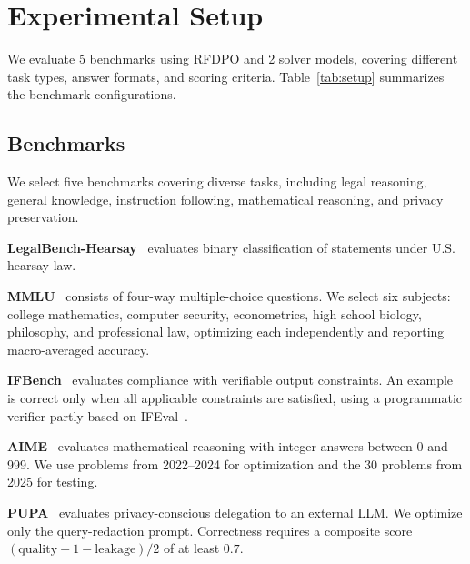 \documentclass[10pt]{article} %
\begin{document}
\section{Experimental Setup}
\label{sec:setup}

We evaluate 5 benchmarks using RFDPO and 2 solver models, covering different task types, answer formats, and scoring criteria. Table~\ref{tab:setup} summarizes the benchmark configurations.

\subsection{Benchmarks}

We select five benchmarks covering diverse tasks, including legal reasoning, general knowledge, instruction following, mathematical reasoning, and privacy preservation.

\textbf{LegalBench-Hearsay}~\citep{guha2023legalbench} evaluates binary classification of statements under U.S. hearsay law.

\textbf{MMLU}~\citep{hendrycks2021mmlu} consists of four-way multiple-choice questions. We select six subjects: college mathematics, computer security, econometrics, high school biology, philosophy, and professional law, optimizing each independently and reporting macro-averaged accuracy.

\textbf{IFBench}~\citep{pyatkin2025ifbench} evaluates compliance with verifiable output constraints. An example is correct only when all applicable constraints are satisfied, using a programmatic verifier partly based on IFEval~\citep{zhou2023ifeval}.

\textbf{AIME}~\citep{maa2025aime} evaluates mathematical reasoning with integer answers between 0 and 999. We use problems from 2022--2024 for optimization and the 30 problems from 2025 for testing.

\textbf{PUPA}~\citep{li2025papillon} evaluates privacy-conscious delegation to an external LLM. We optimize only the query-redaction prompt. Correctness requires a composite score $(\mathrm{quality}+1-\mathrm{leakage})/2$ of at least $0.7$.
\end{document}
